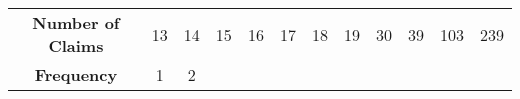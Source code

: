 \documentclass[]{book}
\theoremstyle{definition}
\theoremstyle{definition}
\theoremstyle{definition}
\theoremstyle{remark}
\begin{document}
\begin{longtable}[]{@{}cccccccccccc@{}}
\toprule
\begin{minipage}[t]{0.20\columnwidth}\centering\strut
\textbf{Number of Claims}\strut
\end{minipage} & \begin{minipage}[t]{0.04\columnwidth}\centering\strut
13\strut
\end{minipage} & \begin{minipage}[t]{0.04\columnwidth}\centering\strut
14\strut
\end{minipage} & \begin{minipage}[t]{0.04\columnwidth}\centering\strut
15\strut
\end{minipage} & \begin{minipage}[t]{0.04\columnwidth}\centering\strut
16\strut
\end{minipage} & \begin{minipage}[t]{0.04\columnwidth}\centering\strut
17\strut
\end{minipage} & \begin{minipage}[t]{0.04\columnwidth}\centering\strut
18\strut
\end{minipage} & \begin{minipage}[t]{0.04\columnwidth}\centering\strut
19\strut
\end{minipage} & \begin{minipage}[t]{0.04\columnwidth}\centering\strut
30\strut
\end{minipage} & \begin{minipage}[t]{0.04\columnwidth}\centering\strut
39\strut
\end{minipage} & \begin{minipage}[t]{0.05\columnwidth}\centering\strut
103\strut
\end{minipage} & \begin{minipage}[t]{0.05\columnwidth}\centering\strut
239\strut
\end{minipage}\tabularnewline
\begin{minipage}[t]{0.20\columnwidth}\centering\strut
\textbf{Frequency}\strut
\end{minipage} & \begin{minipage}[t]{0.04\columnwidth}\centering\strut
1\strut
\end{minipage} & \begin{minipage}[t]{0.04\columnwidth}\centering\strut
2\strut
\end{minipage} & \begin{minipage}[t]{0.04\columnwidth}\centering\strut

\end{minipage}
\end{longtable}
\end{document}
